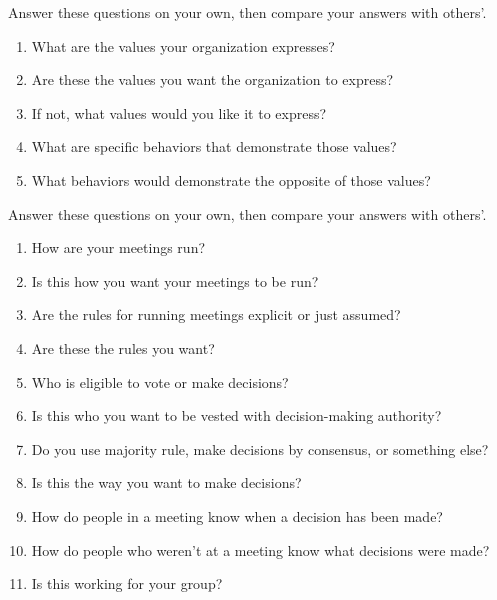 
Answer these questions on your own,
then compare your answers with others'.

\begin{enumerate}

\item
  What are the values your organization expresses?

\item
  Are these the values you want the organization to express?

\item
  If not, what values would you like it to express?

\item
  What are specific behaviors that demonstrate those values?

\item
  What behaviors would demonstrate the opposite of those values?
\end{enumerate}


Answer these questions on your own,
then compare your answers with others'.

\begin{enumerate}

\item
  How are your meetings run?

\item
  Is this how you want your meetings to be run?

\item
  Are the rules for running meetings explicit or just assumed?

\item
  Are these the rules you want?

\item
  Who is eligible to vote or make decisions?

\item
  Is this who you want to be vested with decision-making authority?

\item
  Do you use majority rule, make decisions by consensus, or something else?

\item
  Is this the way you want to make decisions?

\item
  How do people in a meeting know when a decision has been made?

\item
  How do people who weren't at a meeting know what decisions were made?

\item
  Is this working for your group?

\end{enumerate}

